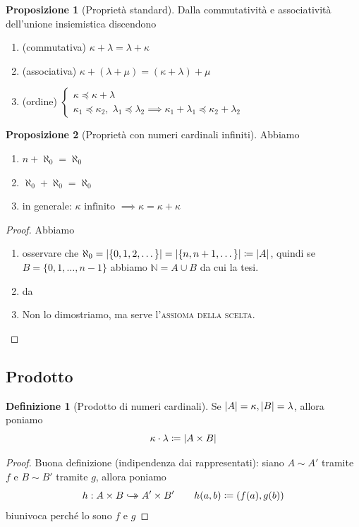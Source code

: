 \documentclass[a4paper,10pt]{article}
\theoremstyle{definition}
\newcommand{\noun}[1]{\textsc{#1}}
\newcommand{\na}{\mathbb{N}} %
\newcommand{\hookdoubleheadrightarrow}{\hookrightarrow\mathrel{\mspace{-15mu}}\rightarrow}
\newcommand{\bij}{\hookdoubleheadrightarrow} %
\theoremstyle{indentdefinition}
\newtheorem{defn}{Definizione}[section]
\theoremstyle{indentpostulate}
\theoremstyle{indenttheorem}
\newtheorem{prop}{Proposizione}[section]
\theoremstyle{myremark}
\theoremstyle{indentgeneral}
\newenvironment{myboxed} 
{\noindent\begin{lrbox}{\mybox}\begin{minipage}{\textwidth}}
{\end{minipage}\end{lrbox}\fbox{\usebox{\mybox}}}
\begin{document}
\begin{prop}[Proprietà standard]
    Dalla commutatività e associatività dell'unione insiemistica discendono
    \begin{enumerate}
        \item (commutativa) $\kappa+\lambda=\lambda+\kappa$
        \item (associativa) $\kappa+(\lambda+\mu)=(\kappa+\lambda)+\mu$
        \item (ordine) $\begin{cases}
            \kappa\preceq \kappa+\lambda\\
            \kappa_1\preceq\kappa_2,\;\lambda_1\preceq\lambda_2\implies\kappa_1+\lambda_1\preceq\kappa_2+\lambda_2
        \end{cases}$
    \end{enumerate}
\end{prop}

\begin{myboxed}
\begin{prop}[Proprietà con numeri cardinali infiniti]
    Abbiamo
    \begin{enumerate}
        \item $n+\aleph_0=\aleph_0$
        \item $\aleph_0+\aleph_0=\aleph_0$
        \item in generale: $\boxed{\kappa\text{ infinito }\implies \kappa=\kappa+\kappa}$
    \end{enumerate}
\end{prop}
\end{myboxed}

\begin{proof}
    Abbiamo
    \begin{enumerate}
        \item osservare  che $\aleph_0=\abs{\{0,1,2,\dots\}}=\abs{\{n,n+1,\dots\}}\coloneqq\abs{A}$, quindi se $B=\{0,1,\dots,n-1\}$ abbiamo $\na=A\cup B$ da cui la tesi. 
        \item da 
        \item Non lo dimostriamo, ma serve l'\noun{assioma della scelta}.
    \end{enumerate}
\end{proof}


\subsection{Prodotto}
\begin{defn}[Prodotto di numeri cardinali] Se
    $\abs{A}=\kappa,\abs{B}=\lambda$, allora poniamo $$\kappa\cdot\lambda\coloneqq\abs{A\times B}$$
\end{defn}
\begin{proof} Buona definizione (indipendenza dai rappresentati): siano $A\sim A'$ tramite $f$ e  $B\sim B'$ tramite $g$, allora poniamo
$$h:A\times B\bij A'\times B'\qquad h(a,b)\coloneqq (f(a),g(b))$$
    biunivoca perché lo sono $f$ e $g$
\end{proof}
\end{document}
